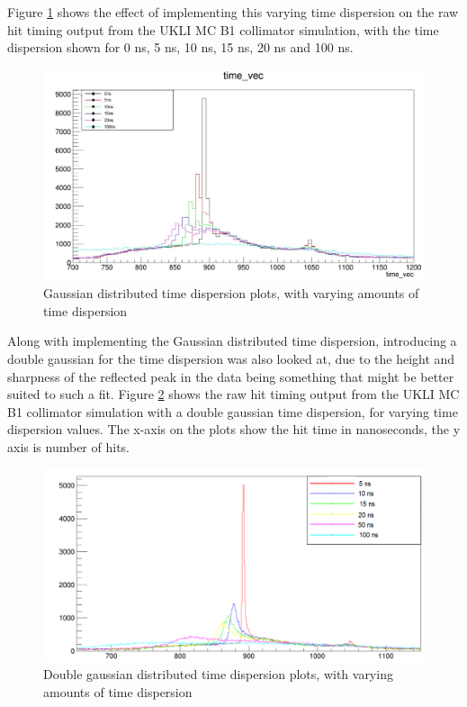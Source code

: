 Figure \ref{fig:gauss_time_dispersion} shows the effect of implementing this varying time dispersion on the raw hit timing output from the UKLI MC B1 collimator simulation, with the time dispersion shown for 0 ns, 5 ns, 10 ns, 15 ns, 20 ns and 100 ns. 

\begin{figure}
    \centering
    \includegraphics[width=\textwidth]{Figures/gauss_time_dispersion.PNG}
    \caption{Gaussian distributed time dispersion plots, with varying amounts of time dispersion}
    \label{fig:gauss_time_dispersion}
\end{figure}

Along with implementing the Gaussian distributed time dispersion, introducing a double gaussian for the time dispersion was also looked at, due to the height and sharpness of the reflected peak in the data being something that might be better suited to such a fit. Figure \ref{fig:double_gauss_time_dispersion} shows the raw hit timing output from the UKLI MC B1 collimator simulation with a double gaussian time dispersion, for varying time dispersion values. The x-axis on the plots show the hit time in nanoseconds, the y axis is number of hits. 

\begin{figure}
    \centering
    \includegraphics[width=\textwidth]{Figures/double_gauss_time_dispersion.PNG}
    \caption{Double gaussian distributed time dispersion plots, with varying amounts of time dispersion}
    \label{fig:double_gauss_time_dispersion}
\end{figure}

